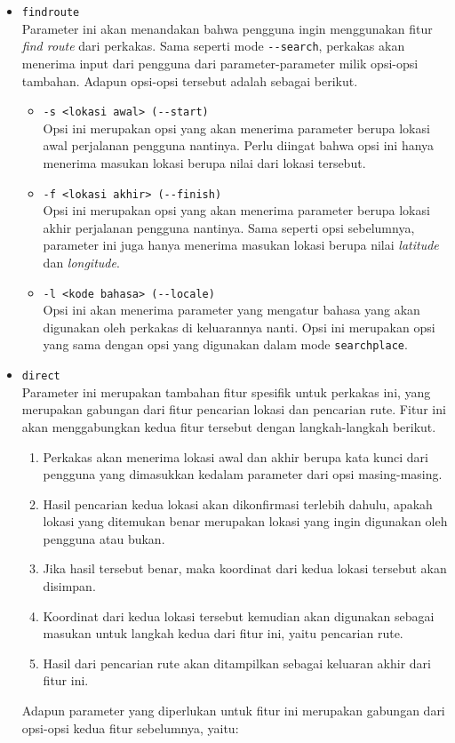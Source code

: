 \begin{itemize}
\begin{itemize}
		\item \verb|findroute|\\
		Parameter ini akan menandakan bahwa pengguna ingin menggunakan fitur \textit{find route} dari perkakas. Sama seperti mode \verb|--search|, perkakas akan menerima input dari pengguna dari parameter-parameter milik opsi-opsi tambahan. Adapun opsi-opsi tersebut adalah sebagai berikut.
		\newpage %
		\begin{itemize}
			\item \verb|-s <lokasi awal> (--start)|\\
			Opsi ini merupakan opsi yang akan menerima parameter berupa lokasi awal \mbox{perjalanan} pengguna nantinya. Perlu diingat bahwa opsi ini hanya menerima masukan lokasi berupa nilai \latlon dari lokasi tersebut.
			\item \verb|-f <lokasi akhir> (--finish)|\\
			Opsi ini merupakan opsi yang akan menerima parameter berupa lokasi akhir perjalanan pengguna nantinya. Sama seperti opsi sebelumnya, parameter ini juga hanya menerima masukan lokasi berupa nilai \textit{latitude} dan \textit{longitude}.
			\item \verb|-l <kode bahasa> (--locale)|\\
			Opsi ini akan menerima parameter yang mengatur bahasa yang akan digunakan oleh perkakas di keluarannya nanti. Opsi ini merupakan opsi yang sama dengan opsi yang digunakan dalam mode \verb|searchplace|.
		\end{itemize}
		
		\item \verb|direct|\\
		Parameter ini merupakan tambahan fitur spesifik untuk perkakas ini, yang merupakan gabungan dari fitur pencarian lokasi dan pencarian rute. Fitur ini akan menggabungkan kedua fitur tersebut dengan langkah-langkah berikut.
		
		\begin{enumerate}
			\item Perkakas akan menerima lokasi awal dan akhir berupa kata kunci dari pengguna yang dimasukkan kedalam parameter dari opsi masing-masing.
			\item Hasil pencarian kedua lokasi akan dikonfirmasi terlebih dahulu, apakah lokasi yang ditemukan benar merupakan lokasi yang ingin digunakan oleh pengguna atau bukan.
			\item Jika hasil tersebut benar, maka koordinat \latlon dari kedua lokasi tersebut akan disimpan.
			\item Koordinat \latlon dari kedua lokasi tersebut kemudian akan digunakan sebagai masukan untuk langkah kedua dari fitur ini, yaitu pencarian rute.
			\item Hasil dari pencarian rute akan ditampilkan sebagai keluaran akhir dari fitur ini.
		\end{enumerate}
		\noindent
		Adapun parameter yang diperlukan untuk fitur ini merupakan gabungan dari opsi-opsi kedua fitur sebelumnya, yaitu:
		

\end{itemize}
\end{itemize}
